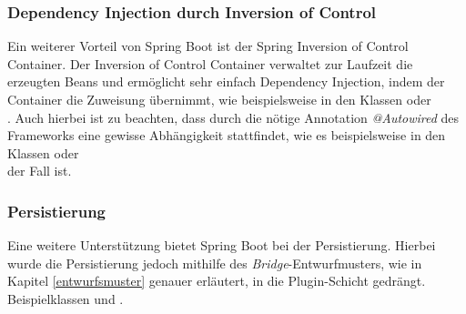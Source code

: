 \subsubsection*{Dependency Injection durch Inversion of Control}
Ein weiterer Vorteil von Spring Boot ist der Spring Inversion of Control Container. Der Inversion of Control Container verwaltet zur Laufzeit die erzeugten Beans und ermöglicht sehr einfach Dependency Injection, indem der Container die Zuweisung übernimmt, wie beispielsweise in den Klassen \href{https://github.com/lucasmerkel/dhbw-advancedswe-programmentwurf/blob/d5c89113d12c3b877ddc4d6a99225b277ddd468f/swe_programmentwurf/consumergoods-inventory-planner/2-cip-application/src/main/java/de/dhbw/cip/application/ConsumerGoodsManager.java#L18}{} oder \\\href{https://github.com/lucasmerkel/dhbw-advancedswe-programmentwurf/blob/d5c89113d12c3b877ddc4d6a99225b277ddd468f/swe_programmentwurf/consumergoods-inventory-planner/0-cip-plugins/src/main/java/de/dhbw/cip/plugins/rest/ConsumerGoodsGuiController.java#L47}{}.
Auch hierbei ist zu beachten, dass durch die nötige Annotation \textit{@Autowired} des Frameworks eine gewisse Abhängigkeit stattfindet, wie es beispielsweise in den Klassen \href{https://github.com/lucasmerkel/dhbw-advancedswe-programmentwurf/blob/d5c89113d12c3b877ddc4d6a99225b277ddd468f/swe_programmentwurf/consumergoods-inventory-planner/2-cip-application/src/main/java/de/dhbw/cip/application/ConsumerGoodsManager.java#L17}{} oder \\\href{https://github.com/lucasmerkel/dhbw-advancedswe-programmentwurf/blob/d5c89113d12c3b877ddc4d6a99225b277ddd468f/swe_programmentwurf/consumergoods-inventory-planner/0-cip-plugins/src/main/java/de/dhbw/cip/plugins/rest/ConsumerGoodsGuiController.java#L46}{} der Fall ist.

\subsubsection*{Persistierung}
Eine weitere Unterstützung bietet Spring Boot bei der Persistierung.
Hierbei wurde die Persistierung jedoch mithilfe des \textit{Bridge}-Entwurfmusters, wie in Kapitel \ref{entwurfsmuster} genauer erläutert, in die Plugin-Schicht gedrängt.
Beispielklassen \href{https://github.com/lucasmerkel/dhbw-advancedswe-programmentwurf/blob/d5c89113d12c3b877ddc4d6a99225b277ddd468f/swe_programmentwurf/consumergoods-inventory-planner/0-cip-plugins/src/main/java/de/dhbw/cip/plugins/persistence/hibernate/ConsumerGoodsRepositoryBridge.java}{} und \href{https://github.com/lucasmerkel/dhbw-advancedswe-programmentwurf/blob/d5c89113d12c3b877ddc4d6a99225b277ddd468f/swe_programmentwurf/consumergoods-inventory-planner/0-cip-plugins/src/main/java/de/dhbw/cip/plugins/persistence/hibernate/PersistenceConsumerGoodsRepository.java}{}.

